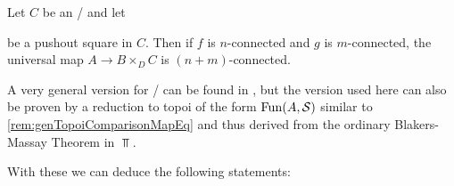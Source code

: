 \begin{prop}\label{prop:blakersMassay}
    Let $C$ be an \inftytop/ and let 
    \begin{center}
    \end{center}
    be a pushout square in $C$.
    Then if $f$ is $n$-connected and $g$ is $m$-connected, the universal map $A\to B\times_{D}C$ is $(n+m)$-connected.
    \begin{reference}
        A very general version for \inftytops/ can be found in \cite[Corollary 4.3.1]{gen_blakers_massey}, but the version used here can also be proven by a reduction to topoi of the form $\operatorname{Fun}(A,\mathcal{S})$ similar to \cref{rem:genTopoiComparisonMapEq} and thus derived from the ordinary Blakers-Massay Theorem in $\Top$.
    \end{reference}
\end{prop}
With these we can deduce the following statements:
